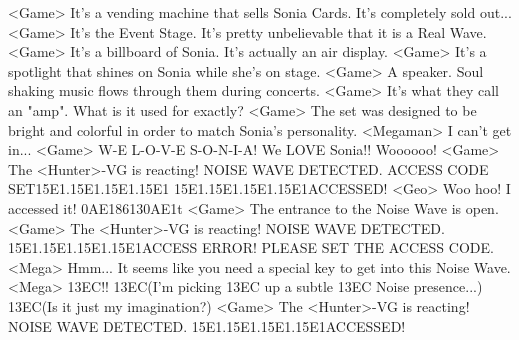 <Game> It's a vending machine that sells Sonia Cards. It's completely sold out... 
<Game> It's the Event Stage. It's pretty unbelievable that it is a Real Wave. 
<Game> It's a billboard of Sonia. It's actually an air display. 
<Game> It's a spotlight that shines on Sonia while she's on stage. 
<Game> A speaker. Soul shaking music flows through them during concerts. 
<Game> It's what they call an "amp". What is it used for exactly? 
<Game> The set was designed to be bright and colorful in order to match Sonia's personality. 
<Megaman> I can't get in... 
<Game> W-E L-O-V-E S-O-N-I-A! We LOVE Sonia!! Woooooo! 
<Game> The <Hunter>-VG is reacting! 
NOISE WAVE DETECTED. 
ACCESS CODE SET{15}{E1}.{15}{E1}.{15}{E1}.{15}{E1} {15}{E1}.{15}{E1}.{15}{E1}.{15}{E1}ACCESSED! 
<Geo> Woo hoo! I accessed it! 
{0A}{E1}{86}{13}{0A}{E1}t
<Game> The entrance to the Noise Wave is open. 
<Game> The <Hunter>-VG is reacting! 
NOISE WAVE DETECTED. {15}{E1}.{15}{E1}.{15}{E1}.{15}{E1}ACCESS ERROR! 
PLEASE SET THE ACCESS CODE. 
<Mega> Hmm... 
It seems like you need a special key to get into this Noise Wave. 
<Mega> {13}{EC}!! 
{13}{EC}(I'm picking {13}{EC} up a subtle {13}{EC} Noise presence...) 
{13}{EC}(Is it just my imagination?) 
<Game> The <Hunter>-VG is reacting! 
NOISE WAVE DETECTED. {15}{E1}.{15}{E1}.{15}{E1}.{15}{E1}ACCESSED! 
